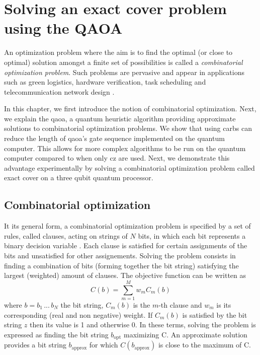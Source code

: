 \chapter{Solving an exact cover problem using the QAOA} \label{ch:qaoa}
An optimization problem where the aim is to find the optimal (or close to optimal) solution amongst a finite set of possibilities is called a \textit{combinatorial optimization problem}.  Such problems are pervasive and appear in applications such as green logistics, hardware verification, task scheduling and telecommunication network design \cite{Sbihi2007CombinatorialA, Coles2018QuantumBeginners, 2014ApplicationsOptimization}.

In this chapter, we first introduce the notion of combinatorial optimization. Next, we explain the \gls{qaoa}, a quantum heuristic algorithm providing approximate solutions to combinatorial optimization problems. We show that using \glspl{carb} can reduce the length of \gls{qaoa}'s gate sequence implemented on the quantum computer. This allows for more complex algorithms to be run on the quantum computer compared to when only \gls{cz} are used. Next, we demonstrate this advantage experimentally by solving a combinatorial optimization problem called exact cover on a three qubit quantum processor.

\section{Combinatorial optimization}
It its general form, a combinatorial optimization problem is specified by a set of rules, called clauses, acting on strings of $N$ bits, in which each bit represents a binary decision variable \cite{Farhi2014AAlgorithm}.  Each clause is satisfied for certain assignments of the bits and unsatisfied for other assignements. Solving the problem consists in finding a combination of bits (forming together the bit string) satisfying the largest (weighted) amount of clauses. The objective function can be written as 
\begin{equation}
    C(b) = \sum_{m=1}^M w_m C_m(b)
\end{equation}
where $b = b_1 \, ...\, b_N$ the bit string,  $C_m(b)$ is the $m$-th clause and $w_m$ is its corresponding (real and non negative) weight. If $C_m(b)$ is satisfied by the bit string $z$ then its value is 1 and otherwise 0. In these terms, solving the problem is expressed as finding the bit string $b_\text{opt}$ maximizing C. An approximate solution provides a bit string $b_{\text{approx}}$ for which  $C(b_{\text{approx}})$ is close to the maximum of C.

